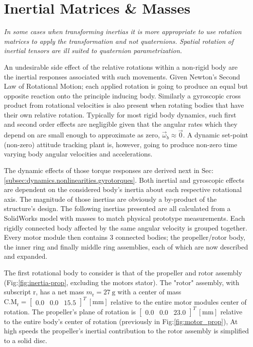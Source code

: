 \section{Inertial Matrices \& Masses}
\label{sec:proto.inertia}
\emph{\color{Gray}In some cases when transforming inertias it is more appropriate to use rotation matrices to apply the transformation and not quaternions. Spatial rotation of inertial tensors are ill suited to quaternion parametrization.}
\par
An undesirable side effect of the relative rotations within a non-rigid body are the inertial responses associated with such movements. Given Newton's Second Law of Rotational Motion; each applied rotation is going to produce an equal but opposite reaction onto the principle inducing body. Similarly a gyroscopic cross product from rotational velocities is also present when rotating bodies that have their own relative rotation. Typically for most rigid body dynamics, such first and second order effects are negligible given that the angular rates which they depend on are small enough to approximate as zero, $\vec{\omega}_b\approx\vec{0}$. A dynamic set-point (non-zero) attitude tracking plant is, however, going to produce non-zero time varying body angular velocities and accelerations.
\par
The dynamic effects of those torque responses are derived next in Sec:\ref{subsec:dynamics.nonlinearities.gyrotorques}. Both inertial and gyroscopic effects are dependent on the considered body's inertia about each respective rotational axis. The magnitude of those inertias are obviously a by-product of the structure's design. The following inertias presented are all calculated from a SolidWorks model with masses to match physical prototype measurements. Each rigidly connected body affected by the same angular velocity is grouped together. Every motor module then contains 3 connected bodies; the propeller/rotor body, the inner ring and finally middle ring assemblies, each of which are now described and expanded. 
\par
The first rotational body to consider is that of the propeller and rotor assembly (Fig:\ref{fig:inertia-prop}, excluding the motors stator). The "rotor" assembly, with subscript r, has a net mass $m_{\text{r}}=27~\text{g}$ with a center of mass $\text{C.M}_{\text{r}}=\begin{bmatrix}0.0&0.0&15.5\end{bmatrix}^T~[\text{mm}]$ relative to the entire motor modules center of rotation. The propeller's plane of rotation is $\begin{bmatrix}0.0&0.0&23.0\end{bmatrix}^T~[\text{mm}]$ relative to the entire body's center of rotation (previously in Fig:\ref{fig:motor_prop}), At high speeds the propeller's inertial contribution to the rotor assembly is simplified to a solid disc. 

